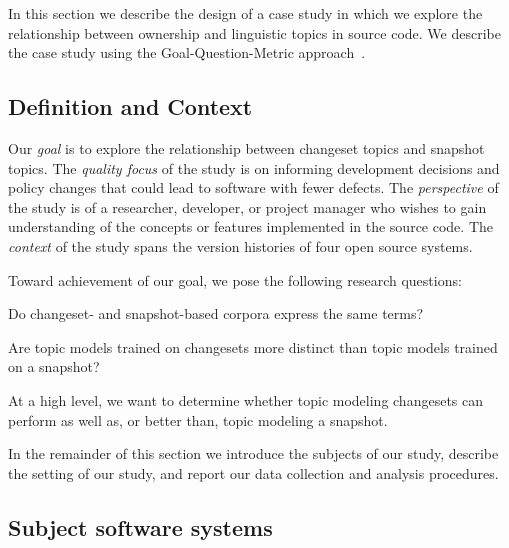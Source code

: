 
In this section we describe the design of a case study in which we
explore the relationship between ownership and linguistic topics in source code.
We describe the case study using the Goal-Question-Metric approach~\cite{Basili-etal:94}.

\subsection{Definition and Context}

Our \textit{goal} is to explore the relationship between changeset topics and snapshot topics.
The \textit{quality focus} of the study is on informing development decisions and policy changes
that could lead to software with fewer defects.
The \textit{perspective} of the study is of a researcher, developer, or project manager who wishes
to gain understanding of the concepts or features implemented in the source code.
The \textit{context} of the study spans the version histories of four open source systems.

Toward achievement of our goal, we pose the following research questions:
\begin{description}[font=\itshape\mdseries,leftmargin=10mm,style=sameline]
    \item[RQ1] Do changeset- and snapshot-based corpora express the same terms?
    \item[RQ2] Are topic models trained on changesets more distinct than topic models trained on a snapshot?
\end{description}
At a high level, we want to determine whether topic modeling changesets can perform as well as, or better than, topic modeling a snapshot.

In the remainder of this section we introduce the subjects of our study,
describe the setting of our study, and report our data collection and analysis procedures.


\subsection{Subject software systems}

